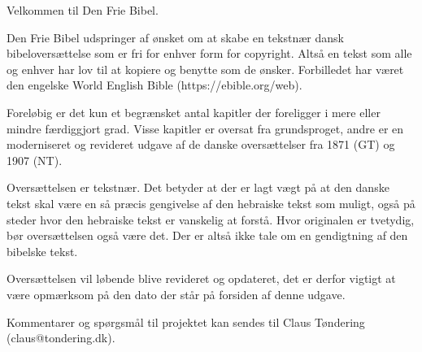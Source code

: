 Velkommen til Den Frie Bibel.

Den Frie Bibel udspringer af ønsket om at skabe en tekstnær dansk bibeloversættelse som er fri for
enhver form for copyright. Altså en tekst som alle og enhver har lov til at kopiere og benytte som
de ønsker. Forbilledet har været den engelske World English Bible (https://ebible.org/web).

Foreløbig er det kun et begrænsket antal kapitler der foreligger i mere eller mindre færdiggjort
grad. Visse kapitler er oversat fra grundsproget, andre er en moderniseret og revideret udgave af de
danske oversættelser fra 1871 (GT) og 1907 (NT).

Oversættelsen er tekstnær. Det betyder at der er lagt vægt på at den danske tekst skal være en så
præcis gengivelse af den hebraiske tekst som muligt, også på steder hvor den hebraiske tekst er
vanskelig at forstå. Hvor originalen er tvetydig, bør oversættelsen også være det. Der er altså ikke
tale om en gendigtning af den bibelske tekst.

Oversættelsen vil løbende blive revideret og opdateret, det er derfor vigtigt at være opmærksom på
den dato der står på forsiden af denne udgave.

Kommentarer og spørgsmål til projektet kan sendes til Claus Tøndering (claus@tondering.dk).
